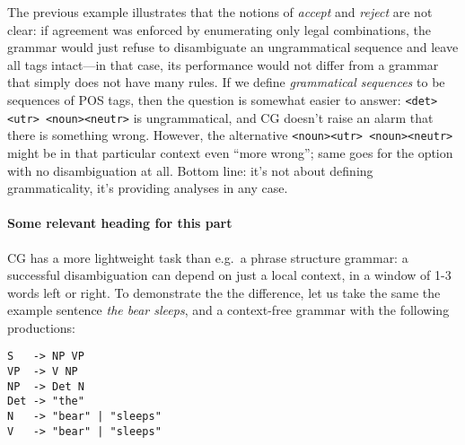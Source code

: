 
The previous example illustrates that the notions of \emph{accept} and \emph{reject} are not clear: if agreement was enforced
by enumerating only legal combinations, the grammar would just refuse to disambiguate
an ungrammatical sequence and leave all tags intact---in that case,
its performance would not differ from a grammar that simply does not have many rules.
If we define \emph{grammatical sequences} to be sequences of POS tags,
then the question is somewhat easier to answer: \texttt{\textless{}det\textgreater{}\textless{}utr\textgreater{} \textless{}noun\textgreater{}\textless{}neutr\textgreater{}} is ungrammatical, and CG doesn't raise an alarm that there is something wrong. However, the alternative \texttt{\textless{}noun\textgreater{}\textless{}utr\textgreater{} \textless{}noun\textgreater{}\textless{}neutr\textgreater{}} might be in that particular context even ``more wrong''; same goes for the option with no disambiguation at all.
Bottom line: it's not about defining grammaticality, it's providing analyses in any case.


\paragraph{Some relevant heading for this part} CG has a more lightweight task than e.g.~a phrase structure grammar: a
successful disambiguation can depend on just a local context, in a
window of 1-3 words left or right. To demonstrate the the difference,
let us take the same the example sentence \emph{the bear sleeps}, and a
context-free grammar with the following productions:


\begin{verbatim}
S   -> NP VP
VP  -> V NP
NP  -> Det N
Det -> "the"
N   -> "bear" | "sleeps"
V   -> "bear" | "sleeps"
\end{verbatim}


